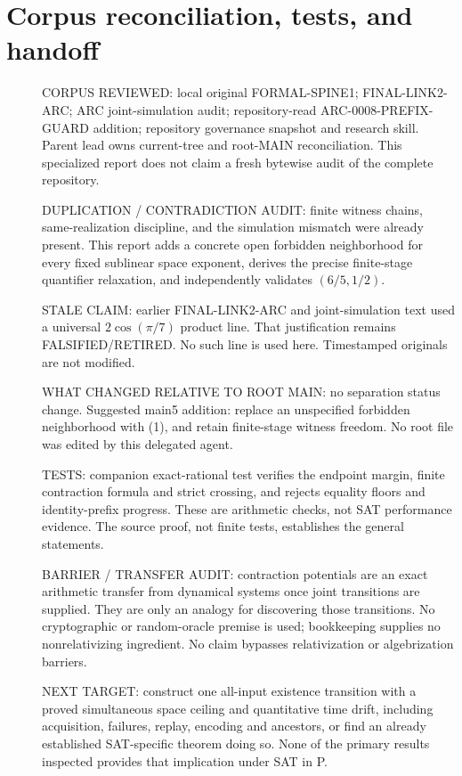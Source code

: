 \documentclass[11pt]{article}
\begin{document}
\section{Corpus reconciliation, tests, and handoff}
\begin{description}
\item[] CORPUS REVIEWED: local original FORMAL-SPINE1; FINAL-LINK2-ARC; ARC joint-simulation audit; repository-read ARC-0008-PREFIX-GUARD addition; repository governance snapshot and research skill. Parent lead owns current-tree and root-MAIN reconciliation. This specialized report does not claim a fresh bytewise audit of the complete repository.
\item[] DUPLICATION / CONTRADICTION AUDIT: finite witness chains, same-realization discipline, and the simulation mismatch were already present. This report adds a concrete open forbidden neighborhood for every fixed sublinear space exponent, derives the precise finite-stage quantifier relaxation, and independently validates $(6/5,1/2)$.
\item[] STALE CLAIM: earlier FINAL-LINK2-ARC and joint-simulation text used a universal $2\cos(\pi/7)$ product line. That justification remains FALSIFIED/RETIRED. No such line is used here. Timestamped originals are not modified.
\item[] WHAT CHANGED RELATIVE TO ROOT MAIN: no separation status change. Suggested main5 addition: replace an unspecified forbidden neighborhood with (1), and retain finite-stage witness freedom. No root file was edited by this delegated agent.
\item[] TESTS: companion exact-rational test verifies the endpoint margin, finite contraction formula and strict crossing, and rejects equality floors and identity-prefix progress. These are arithmetic checks, not SAT performance evidence. The source proof, not finite tests, establishes the general statements.
\item[] BARRIER / TRANSFER AUDIT: contraction potentials are an exact arithmetic transfer from dynamical systems once joint transitions are supplied. They are only an analogy for discovering those transitions. No cryptographic or random-oracle premise is used; bookkeeping supplies no nonrelativizing ingredient. No claim bypasses relativization or algebrization barriers.
\item[] NEXT TARGET: construct one all-input existence transition with a proved simultaneous space ceiling and quantitative time drift, including acquisition, failures, replay, encoding and ancestors, or find an already established SAT-specific theorem doing so. None of the primary results inspected provides that implication under SAT in P.
\end{description}


\end{document}
